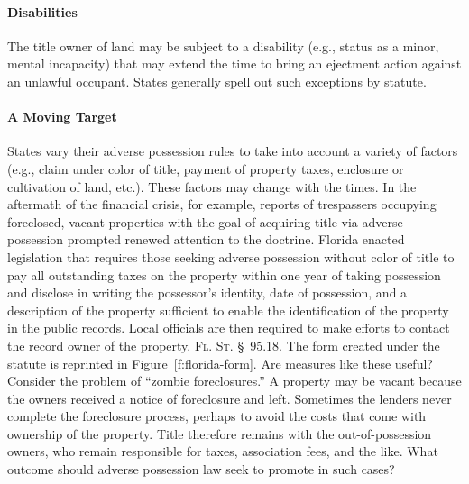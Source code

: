 \paragraph{Disabilities} The title owner of land may be subject to a
disability (e.g., status as a minor, mental incapacity) that may extend the
time to bring an ejectment action against an unlawful occupant. States
generally spell out such exceptions by statute.


\paragraph{A Moving Target} States vary their adverse possession rules to
take into account a variety of factors (e.g., claim under color of title,
payment of property taxes, enclosure or cultivation of land, etc.). These
factors may change with the times. In the aftermath of the financial crisis,
for example, reports of trespassers occupying foreclosed, vacant properties
with the goal of acquiring title via adverse possession prompted renewed
attention to the doctrine. Florida enacted legislation that requires those
seeking adverse possession without color of title to pay all outstanding taxes
on the property within one year of taking possession and disclose in writing
the possessor's identity, date of possession, and a description of the property
sufficient to enable the identification of the property in the public records.
Local officials are then required to make efforts to contact the record owner
of the property. \textsc{Fl. St.} \S~95.18. The form created under the statute
is
reprinted in Figure~\ref{f:florida-form}.
Are measures like these useful? Consider the problem of
``zombie foreclosures.'' A property may be vacant because the owners received a
notice of foreclosure and left. Sometimes the lenders never complete the
foreclosure process, perhaps to avoid the costs that come with ownership of the
property. Title therefore remains with the out-of-possession owners, who remain
responsible for taxes, association fees, and the like. What outcome should
adverse possession law seek to promote in such cases?

